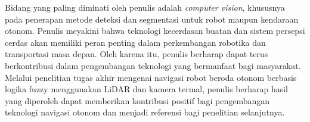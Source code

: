 Bidang yang paling diminati oleh penulis adalah \textit{computer vision}, khususnya pada penerapan metode deteksi dan segmentasi untuk robot maupun kendaraan otonom. Penulis meyakini bahwa teknologi kecerdasan buatan dan sistem persepsi cerdas akan memiliki peran penting dalam perkembangan robotika dan transportasi masa depan. Oleh karena itu, penulis berharap dapat terus berkontribusi dalam pengembangan teknologi yang bermanfaat bagi masyarakat. Melalui penelitian tugas akhir mengenai navigasi robot beroda otonom berbasis logika fuzzy menggunakan LiDAR dan kamera termal, penulis berharap hasil yang diperoleh dapat memberikan kontribusi positif bagi pengembangan teknologi navigasi otonom dan menjadi referensi bagi penelitian selanjutnya.
